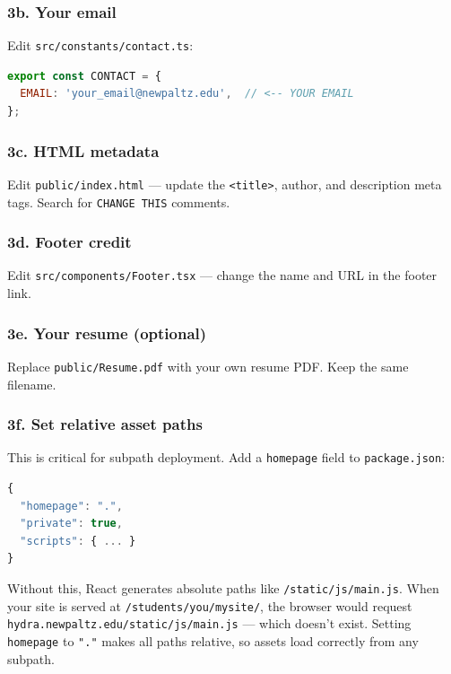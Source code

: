 \documentclass[11pt, letterpaper]{article}
\begin{document}
\subsubsection{3b. Your email}

Edit \texttt{src/constants/contact.ts}:

\begin{lstlisting}[style=code, language=JavaScript]
export const CONTACT = {
  EMAIL: 'your_email@newpaltz.edu',  // <-- YOUR EMAIL
};
\end{lstlisting}

\subsubsection{3c. HTML metadata}

Edit \texttt{public/index.html} --- update the \texttt{<title>}, author, and
description meta tags. Search for \texttt{CHANGE THIS} comments.

\subsubsection{3d. Footer credit}

Edit \texttt{src/components/Footer.tsx} --- change the name and URL in the
footer link.

\subsubsection{3e. Your resume (optional)}

Replace \texttt{public/Resume.pdf} with your own resume PDF. Keep the same
filename.

\subsubsection{3f. Set relative asset paths}

This is critical for subpath deployment. Add a \texttt{homepage} field to
\texttt{package.json}:

\begin{lstlisting}[style=code, language=JavaScript, caption={package.json --- add this line at the top level}]
{
  "homepage": ".",
  "private": true,
  "scripts": { ... }
}
\end{lstlisting}

\begin{warningbox}
Without this, React generates absolute paths like \texttt{/static/js/main.js}.
When your site is served at \texttt{/students/you/mysite/}, the browser would
request \texttt{hydra.newpaltz.edu/static/js/main.js} --- which doesn't exist.
Setting \texttt{homepage} to \texttt{"."} makes all paths relative, so assets
load correctly from any subpath.
\end{warningbox}
\end{document}
